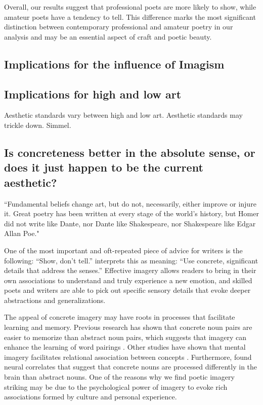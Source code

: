 \documentclass{book}
\begin{document}
Overall, our results suggest that professional poets are more likely to show, while amateur poets have a tendency to tell. This difference marks the most significant distinction between contemporary professional and amateur poetry in our analysis and may be an essential aspect of craft and poetic beauty.

\subsection{Implications for the influence of Imagism}

\subsection{Implications for high and low art}
Aesthetic standards vary between high and low art. Aesthetic standards may trickle down.  Simmel.

\subsection{Is concreteness better in the absolute sense, or does it just happen to be the current aesthetic?}

``Fundamental beliefs change art, but do not, necessarily, either improve or injure it. Great poetry has been written at every stage of the world's history, but Homer did not write like Dante, nor Dante like Shakespeare, nor Shakespeare like Edgar Allan Poe." \citep{lowell1920tendencies}

One of the most important and oft-repeated piece of advice for writers is the following: ``Show, don't tell.'' \cite{Burroway} interprets this as meaning: ``Use concrete, significant details that address the senses.'' Effective imagery allows readers to bring in their own associations to understand and truly experience a new emotion, and skilled poets and writers are able to pick out specific sensory details that evoke deeper abstractions and generalizations. 

The appeal of concrete imagery may have roots in processes that facilitate learning and memory. Previous research has shown that concrete noun pairs are easier to memorize than abstract noun pairs, which suggests that imagery can enhance the learning of word pairings \citep{pairing}. Other studies have shown that mental imagery facilitates relational association between concepts \citep{imagery}. Furthermore, \cite{neuro} found neural correlates that suggest that concrete nouns are processed differently in the brain than abstract nouns. One of the reasons why we find poetic imagery striking may be due to the psychological power of imagery to evoke rich associations formed by culture and personal experience. 
\end{document}
